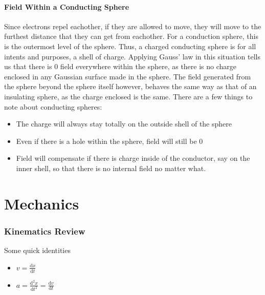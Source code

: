 \documentclass[a4paper,12pt]{article}
\begin{document}
					\subsection{Field Within a Conducting Sphere}
							Since electrons repel eachother, if they are allowed to move, they will move to the furthest distance that they can get from eachother. For a conduction sphere, this is the outermost level of the sphere. Thus, a charged conducting sphere is for all intents and purposes, a shell of charge. Applying Gauss' law in this situation tells us that there is 0 field everywhere within the sphere, as there is no charge enclosed in any Gaussian surface made in the sphere. The field generated from the sphere beyond the sphere itself however, behaves the same way as that of an insulating sphere, as the charge enclosed is the same. 
							There are a few things to note about conducting spheres:
							\begin{itemize}
									\item The charge will always stay totally on the outside shell of the sphere
									\item Even if there is a hole within the sphere, field will still be 0
									\item Field will compensate if there is charge inside of the conductor, say on the inner shell, so that there is no internal field no matter what. 
							\end{itemize}
				\setcounter{subsubsection}{0}




\setcounter{section}{0}
\setcounter{subsection}{0}
\setcounter{subsubsection}{0}
\newpage

\part{Mechanics}
		\section{Kinematics Review}
		Some quick identities
		\begin{itemize}
				\item $v = \frac{\mathrm{d}x}{\mathrm{d}t}$
				\item $a = \frac{\mathrm{d}^{2}x}{\mathrm{d}t^{2}} = \frac{\mathrm{d}v}{\mathrm{d}t}$
		\end{itemize}
\end{document}
